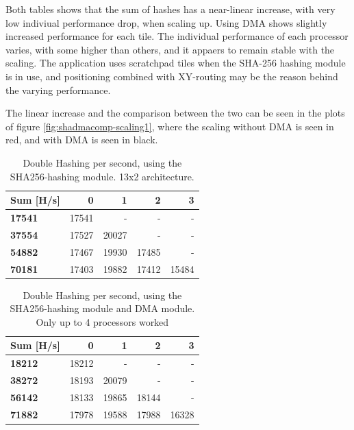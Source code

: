 \begin{appendix}
Both tables shows that the sum of hashes has a near-linear increase, with very low indiviual performance drop, when scaling up.
Using DMA shows slightly increased performance for each tile.
The individual performance of each processor varies, with some higher than others, and it appaers to remain stable with the scaling. 
The application uses scratchpad tiles when the SHA-256 hashing module is in use, and positioning combined with XY-routing may be the reason behind the varying performance.

The linear increase and the comparison between the two can be seen in the plots of figure \ref{fig:shadmacomp-scaling1}, where the scaling without DMA is seen in red, and with DMA is seen in black.

\begin{table}
\begin{tabular}{| l || r r r r |}
  \hline 
  \textbf{Sum} [H/s] & \textbf{0} & \textbf{1} & \textbf{2} & \textbf{3}\\
  \hline                       
  \textbf{17541} & 17541 & - & - & - \\
  \textbf{37554} & 17527 & 20027 & - & - \\
  \textbf{54882} & 17467 & 19930 & 17485 & - \\
  \textbf{70181} & 17403 & 19882 & 17412 & 15484 \\
  \hline  
\end{tabular}
\caption{Double Hashing per second, using the SHA256-hashing module. 13x2 architecture.}
\label{tab:Perf-SHA1}
\end{table}

\begin{table}
\begin{tabular}{| l || r r r r |}
  \hline 
  \textbf{Sum} [H/s] & \textbf{0} & \textbf{1} & \textbf{2} & \textbf{3}\\
  \hline                       
  \textbf{18212} & 18212 & - & - & - \\
  \textbf{38272} & 18193 & 20079 & - & - \\
  \textbf{56142} & 18133 & 19865 & 18144 & - \\
  \textbf{71882} & 17978 & 19588 & 17988 & 16328 \\
  \hline  
\end{tabular}
\caption{Double Hashing per second, using the SHA256-hashing module and DMA module. Only up to 4 processors worked}
\label{tab:Perf-SHADMA1}
\end{table}
				

\end{appendix}
